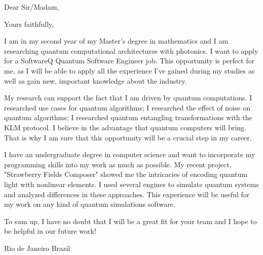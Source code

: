 \documentclass[12pt,a4paper,sans]{moderncv}        %
\begin{document}
	\clearpage
	\date{\today}
	\opening{Dear Sir/Madam,}
	\closing{Yours faithfully,}
	\makelettertitle
	I am in my second year of my Master's degree in mathematics and I am researching quantum computational architectures with photonics. I want to apply for a SoftwareQ Quantum Software Engineer job. This opportunity is perfect for me, as I will be able to apply all the experience I've gained during my studies as well as gain new, important knowledge about the industry.
	
	My research can support the fact that I am driven by quantum computations. I researched use cases for quantum algorithms; I researched the effect of noise on quantum algorithms; I researched quantum entangling transformations with the KLM protocol. I believe in the advantage that quantum computers will bring. That is why I am sure that this opportunity will be a crucial step in my career.
	
	I have an undergraduate degree in computer science and want to incorporate my programming skills into my work as much as possible. My recent project, "Strawberry Fields Composer" showed me the intricacies of encoding quantum light with nonlinear elements. I used several engines to simulate quantum systems and analyzed differences in these approaches. This experience will be useful for my work on any kind of quantum simulations software.
	
	To sum up, I have no doubt that I will be a great fit for your team and I hope to be helpful in our future work!
	

	
	\title{}
	\address{Rua Barata Ribeiro 194}{Rio de Janeiro}{ Brazil }
	\makeletterclosing
	\name{}{}
\end{document}

